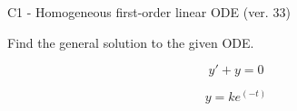 \begin{exercise}
  \begin{exerciseTitle}C1 - Homogeneous first-order linear ODE (ver. 33)\end{exerciseTitle}
  \begin{exerciseStatement}
    
Find the general solution to the given ODE.

    
\[y'+y=0\]

  \end{exerciseStatement}
  \begin{exerciseAnswer}
    
\[y= k e^{\left(-t\right)}\]

  \end{exerciseAnswer}
\end{exercise}